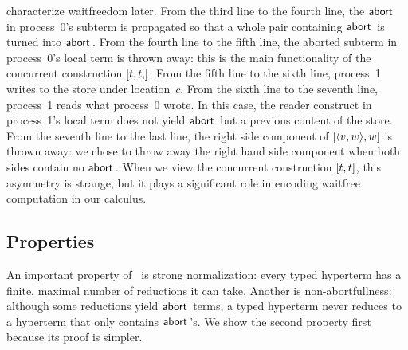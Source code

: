 \begin{example}[Reductions]
 characterize waitfreedom later.
 From the third line to the fourth line,
 the $\mathsf{abort\,}$ in process~0's subterm is propagated so that a whole pair
 containing $\mathsf{abort\,}$ is turned into $\mathsf{abort\,}$.
 From the fourth line to the fifth line,
 the aborted subterm in process~0's local term is thrown away: this is
 the main functionality of the concurrent construction $[{t,t,}]$.
 From the fifth line to the sixth line,
 process~1 writes to the store under location~$c$.
 From the sixth line to the seventh line,
 process~1 reads what process~0 wrote.
 In this case, the reader construct in process~1's local term does not
 yield $\mathsf{abort\,}$ but a previous content of the store.
 From the seventh line to the last line,
 the right side component of $[{\langle{v,w}\rangle,w}]$ is thrown away:
 we chose to throw away the right hand side component when both sides
 contain no $\mathsf{abort\,}$.  When we view the concurrent construction
 $[{t,t}]$, this asymmetry is strange, but it plays a significant
 role in encoding waitfree computation in our calculus.
\end{example}


\subsection{Properties}

An important property of
\lgd\, is strong normalization:
every typed hyperterm has a finite, maximal number of reductions it can
take.
Another is {non-abortfullness}: although some reductions yield
$\mathsf{abort\,}$ terms, a typed hyperterm never reduces to a hyperterm that only
contains $\mathsf{abort\,}$'s.  We show the second property first because its
proof is simpler.

